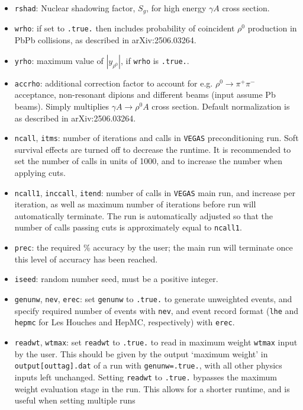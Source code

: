 \documentclass[12pt]{article}
\begin{document}
\begin{itemize}
\item \texttt{rshad}: Nuclear shadowing factor, $S_g$, for high energy $\gamma A$ cross section.
\item \texttt{wrho}: if set to \texttt{.true.} then includes probability of coincident $\rho^0$ production in PbPb collisions, as described in arXiv:2506.03264.
\item \texttt{yrho}: maximum value of $|y_{\rho^0}|$, if \texttt{wrho} is \texttt{.true.}.
\item \texttt{accrho}: additional correction factor to account for e.g. $\rho^0\to \pi^+\pi^-$ acceptance, non-resonant dipions and different beams (input assume Pb beams). Simply multiplies $\gamma A \to \rho^0 A$ cross section.
 Default normalization is as described in arXiv:2506.03264.
\item \texttt{ncall}, \texttt{itms}: number of iterations and calls in \texttt{VEGAS} preconditioning run. Soft 
survival effects are turned off to decrease the runtime. It is recommended to set the number of calls in units of 
1000, and to increase the number when applying cuts.
\item \texttt{ncall1}, \texttt{inccall}, \texttt{itend}: number of calls in \texttt{VEGAS} main run, and increase 
per iteration, as well as maximum number of iterations before run will automatically terminate. The run is 
automatically adjusted so that the number of calls passing cuts is approximately equal to \texttt{ncall1}.
\item  \texttt{prec}: the required \% accuracy by the user; the main run will terminate once this level of accuracy 
has been reached.
\item \texttt{iseed}: random number seed, must be a positive integer.
\item \texttt{genunw}, \texttt{nev}, \texttt{erec}: set \texttt{genunw} to \texttt{.true.} to generate unweighted events,
 and specify required number of events with \texttt{nev}, and event record format (\texttt{lhe} and 
 \texttt{hepmc} for Les Houches and HepMC, respectively) with \texttt{erec}.
\item \texttt{readwt}, \texttt{wtmax}: set \texttt{readwt} to \texttt{.true.} to read in maximum weight \texttt{wtmax} 
input by the user. This should be given by the output `maximum weight' in  \texttt{output[outtag].dat} of a run with 
\texttt{genunw=.true.}, with all other physics inputs left unchanged. Setting \texttt{readwt} to \texttt{.true.} bypasses 
the maximum weight evaluation stage in the run. This allows for a shorter runtime, and is useful when setting multiple runs 

\end{itemize}
\end{document}
